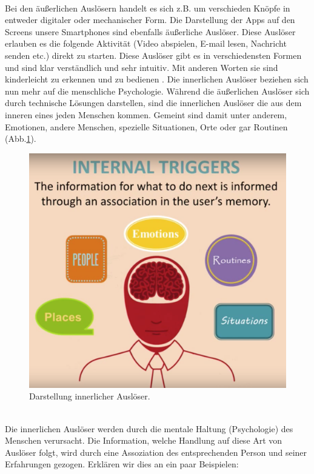 \documentclass[a4paper,12pt,twoside]{scrartcl}
\begin{document}
\\
Bei den äußerlichen Auslösern handelt es sich z.B. um verschieden Knöpfe in entweder digitaler oder mechanischer Form. Die Darstellung der Apps auf den Screens unsere Smartphones sind ebenfalls äußerliche Auslöser. Diese Auslöser erlauben es die folgende Aktivität (Video abspielen, E-mail lesen, Nachricht senden etc.) direkt zu starten. Diese Auslöser gibt es in verschiedensten Formen und sind klar verständlich und sehr intuitiv. Mit anderen Worten sie sind kinderleicht zu erkennen und zu bedienen \cite{Eyal2014}.
\-
Die innerlichen Auslöser beziehen sich nun mehr auf die menschliche Psychologie. Während die äußerlichen Auslöser sich durch technische Lösungen darstellen, sind die innerlichen Auslöser die aus dem inneren eines jeden Menschen kommen. Gemeint sind damit unter anderem, Emotionen, andere Menschen, spezielle Situationen, Orte oder gar Routinen (Abb.\ref{internalTriggerBild}).
\\
\begin{figure}[h!]
\begin{center}
\includegraphics[scale = 0.3]{Bilder/internalTrigger.eps}
\caption{Darstellung innerlicher Auslöser\cite{ExternalTrigger2018}.}
\label{internalTriggerBild}
\end{center}
\end{figure} 
\\
Die innerlichen Auslöser werden durch die mentale Haltung (Psychologie) des Menschen verursacht. Die Information, welche Handlung auf diese Art von Auslöser folgt, wird durch eine Assoziation des entsprechenden Person und seiner Erfahrungen gezogen. Erklären wir dies an ein paar Beispielen:
\end{document}
